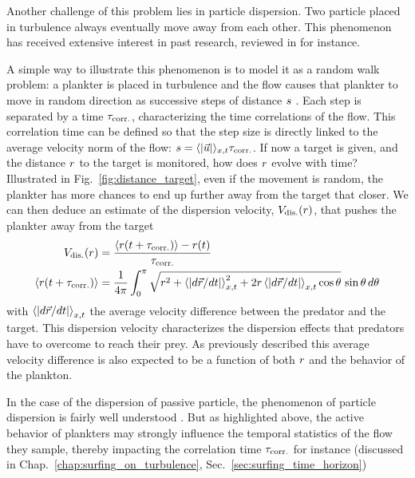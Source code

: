 Another challenge of this problem lies in particle dispersion.
Two particle placed in turbulence always eventually move away from each other.
This phenomenon has received extensive interest in past research, reviewed in \citet{salazar2009two} for instance.

A simple way to illustrate this phenomenon is to model it as a random walk problem:
a plankter is placed in turbulence and the flow causes that plankter to move in random direction as successive steps of distance $s$ .
Each step is separated by a time $\tau_{\mathrm{corr.}}$, characterizing the time correlations of the flow.
This correlation time can be defined so that the step size is directly linked to the average velocity norm of the flow: $s = \langle \lvert\vec{u}\rvert \rangle_{x, t} \tau_{\mathrm{corr.}}$.
If now a target is given, and the distance $r$ to the target is monitored, how does $r$ evolve with time?
Illustrated in Fig.~\ref{fig:distance_target}, even if the movement is random, the plankter has more chances to end up further away from the target that closer.
We can then deduce an estimate of the dispersion velocity, $V_{\mathrm{dis.}}(r)$, that pushes the plankter away from the target
\begin{subequations}
	\begin{align}
		V_{\mathrm{dis.}}(r) &= \frac{\left\langle r(t + \tau_{\mathrm{corr.}}) \right\rangle - r(t)}{\tau_{\mathrm{corr.}}} \\
		\left\langle r(t + \tau_{\mathrm{corr.}}) \right\rangle &= \frac{1}{4\pi} \int_0^\pi \sqrt{r^2 + \left\langle \lvert d \vec{r} / dt\rvert \right\rangle_{x,t}^2 + 2 r \left\langle \lvert d \vec{r} / dt\rvert \right\rangle_{x,t} \cos \theta } \, \sin \theta  \, d\theta
	\end{align}
\end{subequations}
with $\left\langle \lvert d \vec{r} / dt\rvert \right\rangle_{x,t}$ the average velocity difference between the predator and the target.
This dispersion velocity characterizes the dispersion effects that predators have to overcome to reach their prey.
As previously described this average velocity difference is also expected to be a function of both $r$ and the behavior of the plankton.

In the case of the dispersion of passive particle, the phenomenon of particle dispersion is fairly well understood \citep{salazar2009two}.
But as highlighted above, the active behavior of plankters may strongly influence the temporal statistics of the flow they sample, thereby impacting the correlation time $\tau_{\mathrm{corr.}}$ for instance (discussed in Chap.~\ref{chap:surfing_on_turbulence}, Sec.~\ref{sec:surfing_time_horizon})


